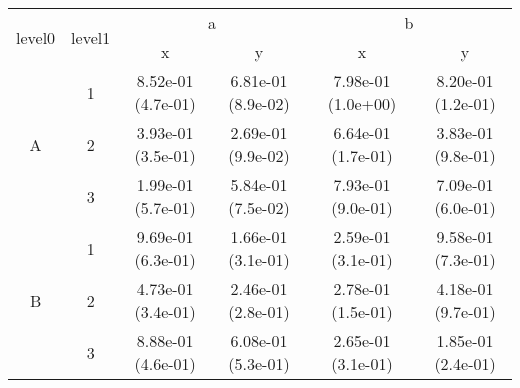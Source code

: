 \begin{tabular}{cccccc}
\toprule
\multirow{2}{*}{level0} & \multirow{2}{*}{level1}&\multicolumn{2}{c}{a}&\multicolumn{2}{c}{b}\tabularnewline
\cmidrule(lr){3-4}
\cmidrule(lr){5-6}
&&x&y&x&y\tabularnewline
\midrule
\multirow{3}{*}{A}&1& 8.52e-01 (4.7e-01)& 6.81e-01 (8.9e-02)& 7.98e-01 (1.0e+00)& 8.20e-01 (1.2e-01)\tabularnewline
&2& 3.93e-01 (3.5e-01)& 2.69e-01 (9.9e-02)& 6.64e-01 (1.7e-01)& 3.83e-01 (9.8e-01)\tabularnewline
&3& 1.99e-01 (5.7e-01)& 5.84e-01 (7.5e-02)& 7.93e-01 (9.0e-01)& 7.09e-01 (6.0e-01)\tabularnewline
\midrule
\multirow{3}{*}{B}&1& 9.69e-01 (6.3e-01)& 1.66e-01 (3.1e-01)& 2.59e-01 (3.1e-01)& 9.58e-01 (7.3e-01)\tabularnewline
&2& 4.73e-01 (3.4e-01)& 2.46e-01 (2.8e-01)& 2.78e-01 (1.5e-01)& 4.18e-01 (9.7e-01)\tabularnewline
&3& 8.88e-01 (4.6e-01)& 6.08e-01 (5.3e-01)& 2.65e-01 (3.1e-01)& 1.85e-01 (2.4e-01)\tabularnewline
\bottomrule
\end{tabular}
